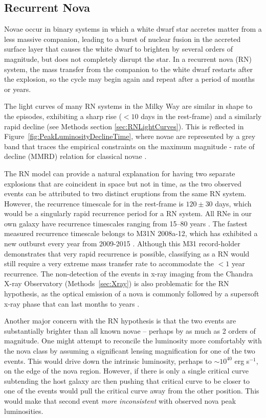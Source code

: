 \subsection{Recurrent Nova}\label{sec:RNe}

Novae occur in binary systems in which a white dwarf star accretes
matter from a less massive companion, leading to a burst of nuclear
fusion in the accreted surface layer that causes the white dwarf to
brighten by several orders of magnitude, but does not completely
disrupt the star. In a recurrent nova (RN) system, the mass transfer
from the companion to the white dwarf restarts after the explosion, so
the cycle may begin again and repeat after a period of months or
years.

The light curves of many RN systems in the Milky Way are similar in
shape to the \spock episodes, exhibiting a sharp rise ($<10$ days in
the rest-frame) and a similarly rapid decline (see Methods section
\ref{sec:RNLightCurves}).  This is reflected in
Figure~\ref{fig:PeakLuminosityDeclineTime}, where novae are
represented by a grey band that traces the empirical constraints on
the maximum magnitude - rate of decline (MMRD) relation for classical
novae \citep{DellaValle:1995, Downes:2000, Shafter:2011,
  Kasliwal:2011a}.

The RN model can provide a natural explanation for having two separate
explosions that are coincident in space but not in time, as the two
observed \spock events can be attributed to two distinct eruptions
from the same RN system.  However, the recurrence timescale for \spock
in the rest-frame is $120\pm30$ days, which would be a singularly
rapid recurrence period for a RN system.  All RNe in our own galaxy
have recurrence timescales ranging from 15--80 years
\citep{Schaefer:2010}.  The fastest measured recurrence timescale
belongs to M31N 2008a-12, which has exhibited a new outburst every
year from 2009-2015
\citep{Tang:2014,Darnley:2014,Darnley:2015,Henze:2015,Henze:2015a}. Although
this M31 record-holder demonstrates that very rapid recurrence is
possible, classifying \spock as a RN would still require a very
extreme mass transfer rate to accommodate the $<1$ year recurrence.
The non-detection of the \spock events in x-ray imaging from the
Chandra X-ray Observatory (Methods~\ref{sec:Xray}) is also problematic
for the RN hypothesis, as the optical emission of a nova is commonly
followed by a supersoft x-ray phase that can last months to years
\citep[e.g.][]{Hachisu:2006}.

Another major concern with the RN hypothesis is that the two \spock
events are substantially brighter than all known novae -- perhaps by
as much as 2 orders of magnitude.  One might attempt to reconcile the
\spock luminosity more comfortably with the nova class by assuming a
significant lensing magnification for one of the two events. This
would drive down the intrinsic luminosity, perhaps to $\sim10^{40}$
erg s$^{-1}$, on the edge of the nova region.  However, if there is
only a single critical curve subtending the \spock host galaxy arc
then pushing that critical curve to be closer to one of the \spock
events would pull the critical curve away from the other \spock
position. This would make that second event {\it more inconsistent} with
observed nova peak luminosities.

